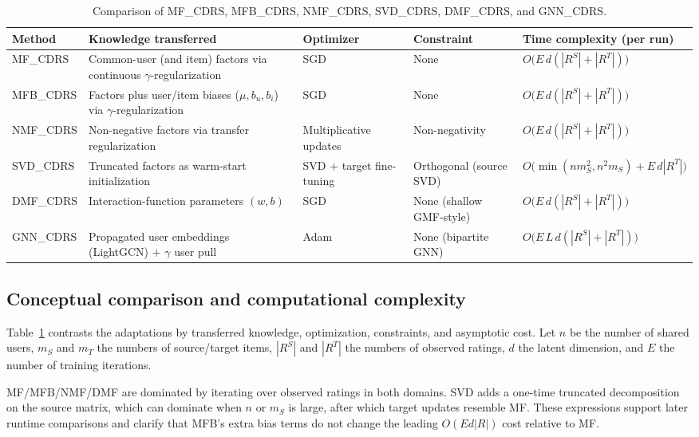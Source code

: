 \documentclass[pdflatex,sn-mathphys-num]{sn-jnl}%
\theoremstyle{thmstyleone}%
\theoremstyle{thmstyletwo}%
\theoremstyle{thmstylethree}%
\begin{document}
\begin{table}[!htbp]
\centering
\caption{Comparison of MF\_CDRS, MFB\_CDRS, NMF\_CDRS, SVD\_CDRS, DMF\_CDRS, and GNN\_CDRS.}
\label{tab:method_compare}
\renewcommand{\arraystretch}{1.2}
\small
\begin{tabular}{p{1.7cm} p{2.6cm} p{2.2cm} p{2.0cm} p{3.6cm}}
\toprule
\textbf{Method} & \textbf{Knowledge transferred} & \textbf{Optimizer} & \textbf{Constraint} & \textbf{Time complexity (per run)} \\
\midrule
MF\_CDRS & Common-user (and item) factors via continuous $\gamma$-regularization & SGD & None & $O\big(E\,d(|R^S|+|R^T|)\big)$ \\
MFB\_CDRS & Factors plus user/item biases ($\mu,b_u,b_i$) via $\gamma$-regularization & SGD & None & $O\big(E\,d(|R^S|+|R^T|)\big)$ \\
NMF\_CDRS & Non-negative factors via transfer regularization & Multiplicative updates & Non-negativity & $O\big(E\,d(|R^S|+|R^T|)\big)$ \\
SVD\_CDRS & Truncated factors as warm-start initialization & SVD + target fine-tuning & Orthogonal (source SVD) & $O\big(\min(n m_S^2, n^2 m_S) + E\,d|R^T|\big)$ \\
DMF\_CDRS & Interaction-function parameters $(w,b)$ & SGD & None (shallow GMF-style) & $O\big(E\,d(|R^S|+|R^T|)\big)$ \\
GNN\_CDRS & Propagated user embeddings (LightGCN) $+$ $\gamma$ user pull & Adam & None (bipartite GNN) & $O\big(E\,L\,d(|R^S|+|R^T|)\big)$ \\
\bottomrule
\end{tabular}
\end{table}

\subsection{Conceptual comparison and computational complexity}
Table~\ref{tab:method_compare} contrasts the adaptations by transferred knowledge, optimization, constraints, and asymptotic cost. Let $n$ be the number of shared users, $m_S$ and $m_T$ the numbers of source/target items, $|R^S|$ and $|R^T|$ the numbers of observed ratings, $d$ the latent dimension, and $E$ the number of training iterations.

MF/MFB/NMF/DMF are dominated by iterating over observed ratings in both domains. SVD adds a one-time truncated decomposition on the source matrix, which can dominate when $n$ or $m_S$ is large, after which target updates resemble MF. These expressions support later runtime comparisons and clarify that MFB's extra bias terms do not change the leading $O(E d |R|)$ cost relative to MF.
\end{document}
